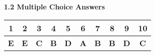 \textbf{\large{1.2 Multiple Choice Answers}} \par

{\renewcommand{\arraystretch}{1.4} %
\begin{tabular}[l]{|c|c|c|c|c|c|c|c|c|c|}
    \hline
    1 & 2 & 3 & 4 & 5 & 6 & 7 & 8 & 9 & 10 \\ \hline
    \textbf{E} & \textbf{E} & \textbf{C} & \textbf{B} & \textbf{D} & \textbf{A} & \textbf{B} & \textbf{B} & \textbf{D} & \textbf{C}\\
    \hline
\end{tabular}}

\bigskip

